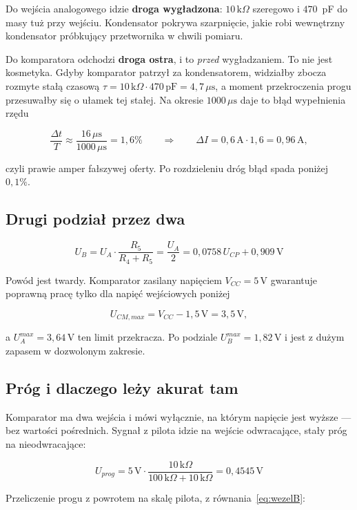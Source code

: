 \documentclass[a4paper,11pt]{article}
\newcommand{\kohm}{\,\mathrm{k}\Omega}
\newcommand{\volt}{\,\mathrm{V}}
\newcommand{\amp}{\,\mathrm{A}}
\newcommand{\us}{\,\mu\mathrm{s}}
\begin{document}
Do wejścia analogowego idzie \textbf{droga wygładzona}: $10\kohm$ szeregowo
i $470$~pF do masy tuż przy wejściu. Kondensator pokrywa szarpnięcie, jakie robi
wewnętrzny kondensator próbkujący przetwornika w chwili pomiaru.

Do komparatora odchodzi \textbf{droga ostra}, i to \emph{przed} wygładzaniem.
To nie jest kosmetyka. Gdyby komparator patrzył za kondensatorem, widziałby zbocza
rozmyte stałą czasową $\tau = 10\kohm\cdot470\,\mathrm{pF}=4{,}7\us$, a moment
przekroczenia progu przesuwałby się o ułamek tej stałej. Na okresie $1000\us$
daje to błąd wypełnienia rzędu

\[
\frac{\Delta t}{T}\approx\frac{16\us}{1000\us}=1{,}6\%
\qquad\Rightarrow\qquad
\Delta I = 0{,}6\amp\cdot1{,}6 = 0{,}96\amp,
\]

czyli prawie amper fałszywej oferty. Po rozdzieleniu dróg błąd spada poniżej
$0{,}1\%$.

\subsection{Drugi podział przez dwa}

\begin{equation}
U_B=U_A\cdot\frac{R_5}{R_4+R_5}=\frac{U_A}{2}=0{,}0758\,U_{CP}+0{,}909\volt
\label{eq:wezelB}
\end{equation}

Powód jest twardy. Komparator zasilany napięciem $V_{CC}=5\volt$ gwarantuje
poprawną pracę tylko dla napięć wejściowych poniżej

\[
U_{CM,max}=V_{CC}-1{,}5\volt=3{,}5\volt ,
\]

a $U_A^{max}=3{,}64\volt$ ten limit przekracza. Po podziale
$U_B^{max}=1{,}82\volt$ i jest z dużym zapasem w dozwolonym zakresie.

\subsection{Próg i dlaczego leży akurat tam}

Komparator ma dwa wejścia i mówi wyłącznie, na którym napięcie jest wyższe --- bez
wartości pośrednich. Sygnał z pilota idzie na wejście odwracające, stały próg na
nieodwracające:

\begin{equation}
U_{prog}=5\volt\cdot\frac{10\kohm}{100\kohm+10\kohm}=0{,}4545\volt
\label{eq:prog}
\end{equation}

Przeliczenie progu z powrotem na skalę pilota, z równania~\eqref{eq:wezelB}:
\end{document}
